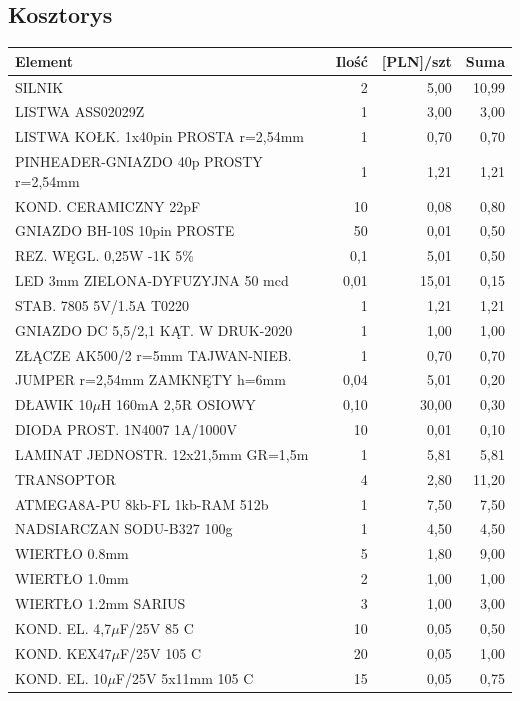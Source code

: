 \documentclass[11pt,a4paper]{article}
\begin{document}
\subsection{Kosztorys}
\begin{longtable}{|l|r|r|r|}
  \hline
  Element & Ilość & [PLN]/szt & Suma \\
  \hline \hline
  SILNIK & 2 & 5,00 & 10,99\\
  LISTWA ASS02029Z & 1 & 3,00 & 3,00 \\
  LISTWA KOŁK. 1x40pin PROSTA r=2,54mm & 1 & 0,70 & 0,70 \\
  PINHEADER-GNIAZDO 40p PROSTY r=2,54mm & 1 & 1,21 & 1,21 \\
  KOND. CERAMICZNY 22pF & 10 & 0,08 & 0,80 \\
  GNIAZDO BH-10S 10pin PROSTE & 50 & 0,01 & 0,50 \\
  REZ. WĘGL. 0,25W -1K 5\% & 0,1 & 5,01 & 0,50 \\
  LED 3mm ZIELONA-DYFUZYJNA 50 mcd & 0,01 & 15,01 & 0,15 \\
  STAB. 7805 5V/1.5A T0220 & 1 & 1,21 & 1,21 \\
  GNIAZDO DC 5,5/2,1 KĄT. W DRUK-2020 & 1 & 1,00 & 1,00 \\
  ZŁĄCZE AK500/2 r=5mm TAJWAN-NIEB. & 1 & 0,70 & 0,70 \\
  JUMPER r=2,54mm ZAMKNĘTY h=6mm & 0,04 & 5,01 & 0,20 \\
  DŁAWIK 10$\mu$H 160mA 2,5R OSIOWY & 0,10 & 30,00 & 0,30 \\
  DIODA PROST. 1N4007 1A/1000V & 10 & 0,01 & 0,10 \\
  LAMINAT JEDNOSTR. 12x21,5mm GR=1,5m & 1 & 5,81 & 5,81 \\
  TRANSOPTOR & 4 & 2,80 & 11,20 \\
  ATMEGA8A-PU 8kb-FL 1kb-RAM 512b & 1 & 7,50 & 7,50 \\
  NADSIARCZAN SODU-B327 100g & 1 & 4,50 & 4,50 \\
  WIERTŁO 0.8mm & 5 & 1,80 & 9,00 \\
  WIERTŁO 1.0mm & 2 & 1,00 & 1,00 \\
  WIERTŁO 1.2mm SARIUS & 3 & 1,00 & 3,00 \\
  KOND. EL. 4,7$\mu$F/25V 85 C & 10 & 0,05 & 0,50 \\ 
  KOND. KEX47$\mu$F/25V 105 C & 20 & 0,05 & 1,00 \\
  KOND. EL. 10$\mu$F/25V 5x11mm 105 C & 15 & 0,05 & 0,75 \\

\end{longtable}
\end{document}

